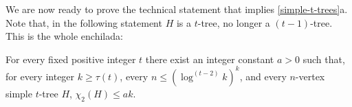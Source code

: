 \documentclass[kpfonts]{patmorin}
\newcommand{\trn}{\chi_2}
\theoremstyle{named}
\newcommand{\weirdref}[2]{\cref{#1}#2}
\begin{document}


We are now ready to prove the technical statement that implies \weirdref{simple-t-trees}{a}. Note that, in the following statement $H$ is a $t$-tree, no longer a $(t-1)$-tree.  This is the whole enchilada:


\begin{lem}\label{two-tree-technical}
    For every fixed positive integer $t$ there exist an integer constant $a>0$ such that, for every integer $k\ge \tau(t)$, every $n\le (\log^{(t-2)} k)^{k}$, and every $n$-vertex simple $t$-tree $H$, $\trn(H)\le ak$.
\end{lem}
\end{document}
